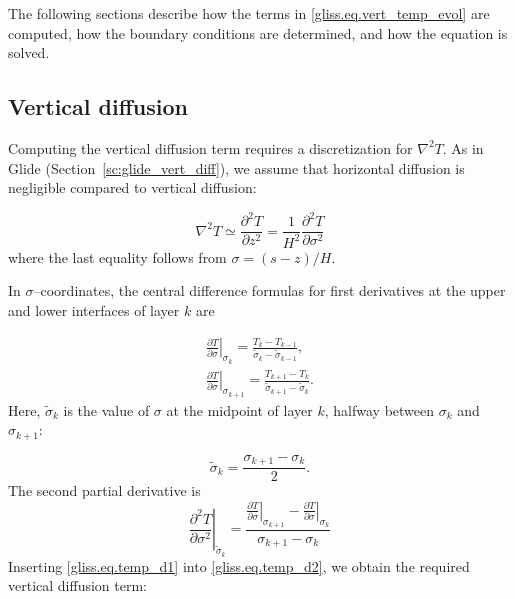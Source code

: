 The following sections describe how the terms in \eqref{gliss.eq.vert_temp_evol} are computed,
how the boundary conditions are determined, and how the equation is solved. 

\subsection{Vertical diffusion}

Computing the vertical diffusion term requires a discretization for ${\nabla}^{2}T$.
As in Glide (Section~\ref{sc:glide_vert_diff}), we assume that horizontal diffusion is
negligible compared to vertical diffusion:

\begin{equation}
  {{\nabla }^{2}}T\simeq \frac{{{\partial }^{2}}T}{\partial {{z}^{2}}}=\frac{1}{{{H}^{2}}}\frac{{{\partial }^{2}}T}{\partial {{\sigma }^{2}}}
\end{equation}
%
where the last equality follows from $\sigma = (s-z)/H$.

In $\sigma$--coordinates, the central difference formulas
for first derivatives at the upper and lower interfaces of layer $k$ are

\begin{equation}
  \label{gliss.eq.temp_d1}
  \begin{split}
    {{\left. \frac{\partial T}{\partial \sigma } \right|}_{{{\sigma }_{k}}}} =
    \frac{{{T}_{k}}-{{T}_{k-1}}}{{{{\tilde{\sigma }}}_{k}}-{{{\tilde{\sigma }}}_{k-1}}},\\
    {{\left. \frac{\partial T}{\partial \sigma } \right|}_{{{\sigma }_{k+1}}}} =
    \frac{{{T}_{k+1}}-{{T}_{k}}}{{{{\tilde{\sigma }}}_{k+1}}-{{{\tilde{\sigma }}}_{k}}}.
  \end{split}
\end{equation}
%
Here, $\tilde{\sigma}_k$ is the value of $\sigma$ at the midpoint of layer $k$, 
halfway between $\sigma_{k}$ and $\sigma_{k+1}$:

\begin{equation}
  \tilde{\sigma}_k = \frac{\sigma_{k+1} - \sigma_{k}} {2}.
\end{equation}
%
The second partial derivative is
\begin{equation}
  \label{gliss.eq.temp_d2}
        {{\left. \frac{{{\partial }^{2}}T}{\partial {{\sigma }^{2}}} \right|}_{{{{\tilde{\sigma }}}_{k}}}} =
        \frac{{{\left. \frac{\partial T}{\partial \sigma } \right|}_{{{\sigma }_{k+1}}}} - {{\left. \frac{\partial T}{\partial \sigma } \right|}_{{{\sigma }_{k}}}}} 
             {{{\sigma }_{k+1}}-{{\sigma }_{k}}}
\end{equation}
%
Inserting \eqref{gliss.eq.temp_d1} into \eqref{gliss.eq.temp_d2}, we obtain
the required vertical diffusion term:

